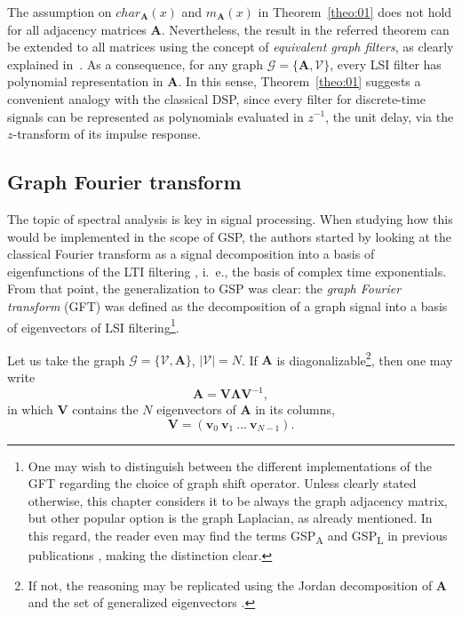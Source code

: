 The assumption on $char_{\mathbf{A}}(x)$ and $m_{\mathbf{A}}(x)$ in Theorem~\ref{theo:01} does not hold for all adjacency matrices $\mathbf{A}$. Nevertheless, the result in the referred theorem can be extended to all matrices using the concept of \emph{equivalent graph filters}, as clearly explained in~\cite{sandryhaila2013filters}. As a consequence, for any graph $\mathcal{G} = \{\mathbf{A}, \mathcal{V}\}$, every LSI filter has polynomial representation in $\mathbf{A}$. In this sense, Theorem~\ref{theo:01} suggests a convenient analogy with the classical DSP, since every filter for discrete-time signals can be represented as polynomials evaluated in $ z^{-1} $, the unit delay, via the $z$-transform of its impulse response.

\subsection{Graph Fourier transform}

The topic of spectral analysis is key in signal processing. When studying how this would be implemented in the scope of GSP, the authors started by looking at the classical Fourier transform as a signal decomposition into a basis of eigenfunctions of the LTI filtering \cite{oppenheim1997signals}, i.~e., the basis of complex time exponentials. From that point, the generalization to GSP was clear: the \emph{graph Fourier transform} (GFT) was defined as the decomposition of a graph signal into a basis of eigenvectors of LSI filtering\footnote{One may wish to distinguish between the different implementations of the GFT regarding the choice of graph shift operator. Unless clearly stated otherwise, this chapter considers it to be always the graph adjacency matrix, but other popular option is the graph Laplacian, as already mentioned. In this regard, the reader even may find the terms GSP\textsubscript{A} and GSP\textsubscript{L} in previous publications \cite{ribeiro2018}, making the distinction clear.}.

Let us take the graph $ \mathcal{G} = \{\mathcal{V}, \mathbf{A}\} $, $ |\mathcal{V}| =N $. If $ \mathbf{A} $ is diagonalizable\footnote{If not, the reasoning may be replicated using the Jordan decomposition of $ \mathbf{A} $ and the set of generalized eigenvectors \cite{deri2017spectral}.}, then one may write
\begin{equation}\label{eq:gft_01}
\mathbf{A} = \mathbf{V} \mathbf{\Lambda} \mathbf{V}^{-1},
\end{equation}
in which $ \mathbf{V} $ contains the $ N $ eigenvectors of $ \mathbf{A} $ in its columns,
\begin{equation}\label{eq:gft_02}
\mathbf{V} = (\mathbf{v}_0 \ \mathbf{v}_1 \ \dots\ \mathbf{v}_{N-1}).
\end{equation}

